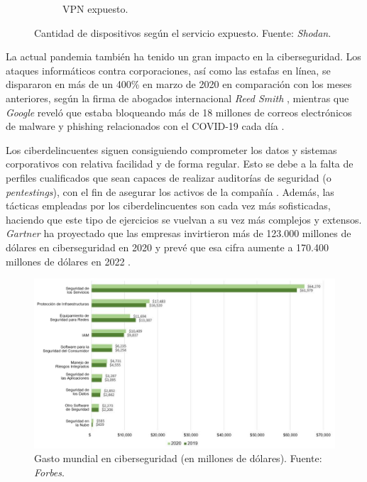 \begin{figure}[h]
\begin{subfigure}[b]{0.3\textwidth}
        \caption{VPN expuesto.}
        \label{fig:servicio vpn expuesto}
     \end{subfigure}
    \caption{Cantidad de dispositivos según el servicio expuesto. Fuente: \textit{Shodan}.}
    \label{fig:servicios expuestos}
\end{figure}

La actual pandemia también ha tenido un gran impacto en la ciberseguridad. Los ataques informáticos contra corporaciones, así como las estafas en línea, se dispararon en más de un 400\% en marzo de 2020 en comparación con los meses anteriores, según la firma de abogados internacional \textit{Reed Smith} \cite{reedsmithcovidfraud}, mientras que \textit{Google} reveló que estaba bloqueando más de 18 millones de correos electrónicos de malware y phishing relacionados con el COVID-19 cada día \cite{googlecovidfraud}.\sn

Los ciberdelincuentes  siguen consiguiendo comprometer los datos y sistemas corporativos con relativa facilidad y de forma regular. Esto se debe a la falta de perfiles cualificados que sean capaces de realizar auditorías de seguridad (o \textit{pentestings}), con el fin de asegurar los activos de la compañía \cite{cybersecurityspecialist}. Además, las tácticas empleadas por los ciberdelincuentes son cada vez más sofisticadas, haciendo que este tipo de ejercicios se vuelvan a su vez más complejos y extensos. \textit{Gartner} ha proyectado que las empresas invirtieron más de 123.000 millones de dólares en ciberseguridad en 2020  y prevé que esa cifra aumente a 170.400 millones de dólares en 2022 \cite{cibersecuritybudget}.\n

\begin{figure}[h]
    \centering
    \includegraphics[width=15cm]{img/tables/04_Cybersecurity-Budget.png}
    \caption{Gasto mundial en ciberseguridad (en millones de dólares). Fuente: \textit{Forbes}.}
    \label{fig:cybersecuritybudget}
\end{figure}

